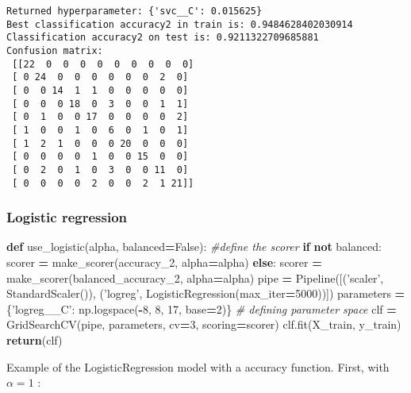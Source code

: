 \documentclass[10pt,a4paper]{article}
\newenvironment{Shaded}{\begin{snugshade}}{\end{snugshade}}
\newcommand{\CommentTok}[1]{\textcolor[rgb]{0.56,0.35,0.01}{\textit{#1}}}
\newcommand{\ControlFlowTok}[1]{\textcolor[rgb]{0.13,0.29,0.53}{\textbf{#1}}}
\newcommand{\DecValTok}[1]{\textcolor[rgb]{0.00,0.00,0.81}{#1}}
\newcommand{\KeywordTok}[1]{\textcolor[rgb]{0.13,0.29,0.53}{\textbf{#1}}}
\newcommand{\NormalTok}[1]{#1}
\newcommand{\OperatorTok}[1]{\textcolor[rgb]{0.81,0.36,0.00}{\textbf{#1}}}
\newcommand{\StringTok}[1]{\textcolor[rgb]{0.31,0.60,0.02}{#1}}
\newcommand{\VariableTok}[1]{\textcolor[rgb]{0.00,0.00,0.00}{#1}}
\theoremstyle{break}
\begin{document}
\begin{verbatim}
Returned hyperparameter: {'svc__C': 0.015625}
Best classification accuracy2 in train is: 0.9484628402030914
Classification accuracy2 on test is: 0.9211322709685881
Confusion matrix: 
 [[22  0  0  0  0  0  0  0  0  0]
 [ 0 24  0  0  0  0  0  0  2  0]
 [ 0  0 14  1  1  0  0  0  0  0]
 [ 0  0  0 18  0  3  0  0  1  1]
 [ 0  1  0  0 17  0  0  0  0  2]
 [ 1  0  0  1  0  6  0  1  0  1]
 [ 1  2  1  0  0  0 20  0  0  0]
 [ 0  0  0  0  1  0  0 15  0  0]
 [ 0  2  0  1  0  3  0  0 11  0]
 [ 0  0  0  0  2  0  0  2  1 21]]
\end{verbatim}

\hypertarget{logistic-regression}{%
\subsubsection{Logistic regression}\label{logistic-regression}}

\begin{Shaded}
\begin{Highlighting}[]
\KeywordTok{def}\NormalTok{ use_logistic(alpha, balanced}\OperatorTok{=}\VariableTok{False}\NormalTok{):}
    \CommentTok{#define the scorer}
    \ControlFlowTok{if} \KeywordTok{not}\NormalTok{ balanced:}
\NormalTok{        scorer }\OperatorTok{=}\NormalTok{ make_scorer(accuracy_2, alpha}\OperatorTok{=}\NormalTok{alpha)}
    \ControlFlowTok{else}\NormalTok{:}
\NormalTok{        scorer }\OperatorTok{=}\NormalTok{ make_scorer(balanced_accuracy_2, alpha}\OperatorTok{=}\NormalTok{alpha)  }
\NormalTok{    pipe }\OperatorTok{=}\NormalTok{ Pipeline([(}\StringTok{'scaler'}\NormalTok{, StandardScaler()), (}\StringTok{'logreg'}\NormalTok{, LogisticRegression(max_iter}\OperatorTok{=}\DecValTok{5000}\NormalTok{))])}
\NormalTok{    parameters }\OperatorTok{=}\NormalTok{ \{}\StringTok{'logreg__C'}\NormalTok{: np.logspace(}\OperatorTok{-}\DecValTok{8}\NormalTok{, }\DecValTok{8}\NormalTok{, }\DecValTok{17}\NormalTok{, base}\OperatorTok{=}\DecValTok{2}\NormalTok{)\} }\CommentTok{# defining parameter space}
\NormalTok{    clf }\OperatorTok{=}\NormalTok{ GridSearchCV(pipe, parameters, cv}\OperatorTok{=}\DecValTok{3}\NormalTok{, scoring}\OperatorTok{=}\NormalTok{scorer)}
\NormalTok{    clf.fit(X_train, y_train)}
    \ControlFlowTok{return}\NormalTok{(clf)}
\end{Highlighting}
\end{Shaded}

Example of the LogisticRegression model with a accuracy function. First, with \(\alpha = 1\) :
\end{document}
